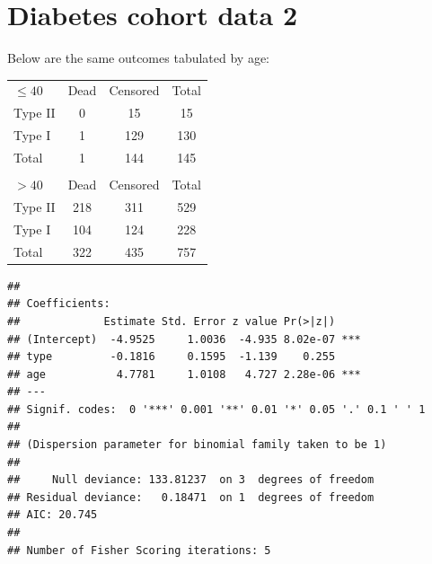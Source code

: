 \documentclass[landscape,twocolumn,letterpaper,9pt,reqno]{article}\usepackage[]{graphicx}\usepackage[]{color}
\newenvironment{knitrout}{}{} %
\begin{document}
\clearpage

\section{Diabetes cohort data 2}

Below are the same outcomes tabulated by age:

\begin{table}[h]
	\centering
	\begin{tabular}{lcc|c}
		$\leq 40$ & Dead &  Censored & Total\\
		Type II & 0 & 15 & 15 \\
		Type I & 1 & 129 & 130 \\
		\hline
		Total & 1 & 144 & 145 \\
		& & & \\
		$> 40$ & Dead &  Censored & Total\\
		Type II & 218 & 311 & 529 \\
		Type I & 104 & 124 & 228 \\
		\hline
		Total & 322 & 435 & 757 \\ 
	\end{tabular}
\end{table}


\begin{knitrout}
\color{fgcolor}
\begin{verbatim}
## 
## Coefficients:
##             Estimate Std. Error z value Pr(>|z|)    
## (Intercept)  -4.9525     1.0036  -4.935 8.02e-07 ***
## type         -0.1816     0.1595  -1.139    0.255    
## age           4.7781     1.0108   4.727 2.28e-06 ***
## ---
## Signif. codes:  0 '***' 0.001 '**' 0.01 '*' 0.05 '.' 0.1 ' ' 1
## 
## (Dispersion parameter for binomial family taken to be 1)
## 
##     Null deviance: 133.81237  on 3  degrees of freedom
## Residual deviance:   0.18471  on 1  degrees of freedom
## AIC: 20.745
## 
## Number of Fisher Scoring iterations: 5
\end{verbatim}

\end{knitrout}
\end{document}
